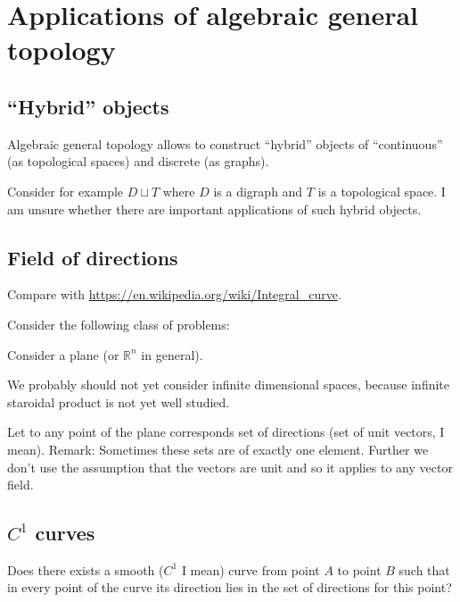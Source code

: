 \chapter{Applications of algebraic general topology}


\section{``Hybrid'' objects}

Algebraic general topology allows to construct ``hybrid'' objects of ``continuous'' (as topological spaces)
and discrete (as graphs).

Consider for example $D\sqcup T$ where $D$ is a digraph and $T$ is a topological space.
I am unsure whether there are important applications of such hybrid objects.

\section{Field of directions}


Compare with \url{https://en.wikipedia.org/wiki/Integral_curve}.

Consider the following class of problems:

Consider a plane (or $\mathbb{R}^n$ in general).

We probably should not yet consider infinite dimensional spaces,
because infinite staroidal product is not yet well studied.

Let to any point of the plane corresponds set of directions (set of unit vectors, I mean).
Remark: Sometimes these sets are of exactly one element. Further we
don't use the assumption that the vectors are unit and so it applies to any vector field.

\section{\texorpdfstring{$C^1$ curves}{C1 curves}}

Does there exists a smooth ($C^1$ I mean) curve from point $A$ to point $B$ such that in every point of the curve its direction lies in the set of directions for this point?

